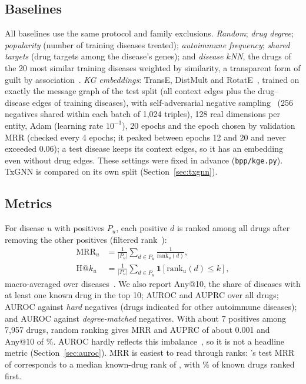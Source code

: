 \documentclass[journal]{IEEEtran}
\begin{document}
\subsection{Baselines}
All baselines use the same protocol and family exclusions. \emph{Random}; \emph{drug degree}; \emph{popularity} (number of training diseases treated); \emph{autoimmune frequency}; \emph{shared targets} (drug targets among the disease's genes); and \emph{disease $k$NN}, the drugs of the 20 most similar training diseases weighted by similarity, a transparent form of guilt by association~\cite{bang2023dreamwalk}. \emph{KG embeddings}: TransE, DistMult and RotatE~\cite{bordes2013transe,yang2015distmult,sun2019rotate}, trained on exactly the message graph of the test split (all context edges plus the drug--disease edges of training diseases), with self-adversarial negative sampling~\cite{sun2019rotate} (256 negatives shared within each batch of 1,024 triples), 128 real dimensions per entity, Adam (learning rate $10^{-3}$), 20 epochs and the epoch chosen by validation MRR (checked every 4 epochs; it peaked between epochs 12 and 20 and never exceeded 0.06); a test disease keeps its context edges, so it has an embedding even without drug edges. These settings were fixed in advance (\texttt{bpp/kge.py}). TxGNN is compared on its own split (Section~\ref{sec:txgnn}).

\subsection{Metrics}
For disease $u$ with positives $P_u$, each positive $d$ is ranked among all drugs after removing the other positives (filtered rank~\cite{bordes2013transe}):
\begin{align}
\mathrm{MRR}_u&=\frac{1}{|P_u|}\sum_{d\in P_u}\frac{1}{\mathrm{rank}_u(d)},\\
\mathrm{H@}k_u&=\frac{1}{|P_u|}\sum_{d\in P_u}\mathbf{1}[\mathrm{rank}_u(d)\le k],
\end{align}
macro-averaged over diseases~\cite{voorhees1999trec}. We also report Any@10, the share of diseases with at least one known drug in the top 10; AUROC and AUPRC over all drugs; AUROC against \emph{hard} negatives (drugs indicated for other autoimmune diseases); and AUROC against \emph{degree-matched} negatives. With about 7 positives among 7,957 drugs, random ranking gives MRR and AUPRC of about 0.001 and Any@10 of \RandExpAnyTenTest\%. AUROC hardly reflects this imbalance~\cite{saito2015prc}, so it is not a headline metric (Section~\ref{sec:auroc}). MRR is easiest to read through ranks: \sysname's test MRR of \TestMrr{} corresponds to a median known-drug rank of \MedRankTest, with \RankOneShareTest\% of known drugs ranked first.
\end{document}
